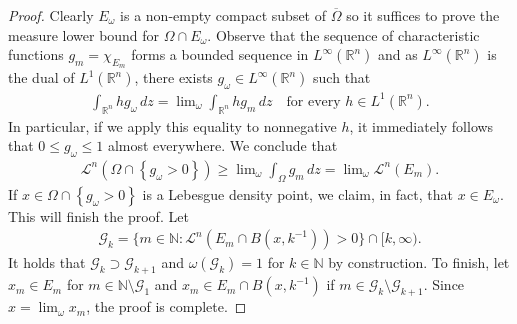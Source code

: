 \documentclass[10pt,a4paper]{amsart}
\newcommand{\N}{\mathbb{N}}
\newcommand{\lm}{\mathscr{L}}
\begin{document}
\begin{proof}
Clearly $E_\omega$ is a non-empty compact subset of $\overline{\Omega}$ so it suffices to prove the measure lower bound for $\Omega \cap E_\omega$.
%
%
Observe that the sequence of characteristic functions $g_m = \chi_{ E_m }$ forms a bounded sequence in $L^{\infty}( \mathbb{R}^n )$ and as $L^{\infty}( \mathbb{R}^n )$ is the dual of $L^{1}( \mathbb{R}^n )$, there exists $g_\omega \in L^{\infty}( \mathbb{R}^n )$ such that
\begin{align*}
    \int_{ \mathbb{R}^n } h g_\omega \,dz = \lim\nolimits_{\omega} \int_{ \mathbb{R}^n } h g_m \,dz
    \quad\text{for every $h \in L^{1}( \mathbb{R}^n )$.}
\end{align*}
In particular, if we apply this equality to nonnegative $h$, it immediately follows that $0 \leq g_\omega \leq 1$ almost everywhere. We conclude that
\begin{align*}
    \lm^n( \Omega \cap \left\{ g_\omega > 0 \right\} )
    \geq
    \lim\nolimits_{\omega} \int_{ \Omega } g_m \,dz
    =
    \lim\nolimits_{\omega} \lm^n( E_m ).
\end{align*}
If $x \in \Omega \cap \left\{ g_\omega > 0 \right\}$ is a Lebesgue density point, we claim, in fact, that $x \in E_\omega$. This will finish the proof. Let
\begin{align*}
    \mathcal{G}_k = \{ m \in \N \colon \lm^{n}( E_m \cap B( x, k^{-1} ) ) > 0 \} \cap [k,\infty).
\end{align*}
It holds that $\mathcal{G}_{k} \supset \mathcal{G}_{k+1}$ and $\omega( \mathcal{G}_k ) = 1$ for $k \in \N$ by construction. To finish, let $x_m \in E_m$ for $m \in \N \setminus \mathcal{G}_1$ and $x_m \in E_m \cap B( x, k^{-1} )$ if $m \in \mathcal{G}_{k} \setminus \mathcal{G}_{k+1}$. Since $x = \lim\nolimits_{\omega} x_m$, the proof is complete.
\end{proof}
\end{document}
